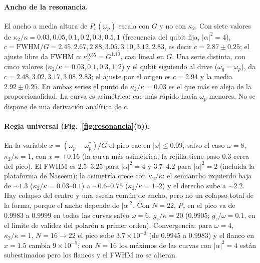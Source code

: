 \documentclass[11pt,a4paper]{article}
\newcommand{\wps}{\omega_p^{*}}
\theoremstyle{definition}
\begin{document}
\paragraph{Ancho de la resonancia.} El ancho a media altura de $P_c(\omega_p)$ escala con $G$ y no con $\kappa_2$. Con siete valores de $\kappa_2/\kappa=0.03,0.05,0.1,0.2,0.3,0.5,1$ (frecuencia del qubit fija, $|\alpha|^2=4$), $c=\mathrm{FWHM}/G=2.45,2.67,2.88,3.05,3.10,3.12,2.83$, es decir $c=2.87\pm0.25$; el ajuste libre da $\mathrm{FWHM}\propto\kappa_2^{0.55}=G^{1.10}$, casi lineal en $G$. Una serie distinta, con cinco valores ($\kappa_2/\kappa=0.03,0.1,0.3,1,2$) y el qubit siguiendo al drive ($\omega_q=\omega_p$), da $c=2.48,3.02,3.17,3.08,2.83$; el ajuste por el origen es $c=2.94$ y la media $2.92\pm0.25$. En ambas series el punto de $\kappa_2/\kappa=0.03$ es el que más se aleja de la proporcionalidad. La curva es asimétrica: cae más rápido hacia $\omega_p$ menores. No se dispone de una derivación analítica de $c$.

\paragraph{Regla universal (Fig.~\ref{fig:resonancia}(b)).} En la variable $x=(\omega_p-\wps)/G$ el pico cae en $|x|\leq0.09$, salvo el caso $\omega=8$, $\kappa_2/\kappa=1$, con $x=+0.16$ (la curva más asimétrica; la rejilla tiene paso $0.3$ cerca del pico). El FWHM es $2.5$--$3.25$ para $|\alpha|^2=4$ y $3.7$--$4.2$ para $|\alpha|^2=2$ (incluida la plataforma de Naseem); la asimetría crece con $\kappa_2/\kappa$: el semiancho izquierdo baja de $\sim1.3$ ($\kappa_2/\kappa=0.03$--$0.1$) a $\sim0.6$--$0.75$ ($\kappa_2/\kappa=1$--$2$) y el derecho sube a $\sim2.2$. Hay colapso del centro y una escala común de ancho, pero no un colapso total de la forma, porque el ancho depende de $|\alpha|^2$. Con $N=22$, $P_c$ en el pico va de $0.9983$ a $0.9999$ en todas las curvas salvo $\omega=6$, $g_z/\kappa=20$ ($0.9905$; $g_z/\omega=0.1$, en el límite de validez del polarón a primer orden). Convergencia: para $\omega=4$, $\kappa_2/\kappa=1$, $N=16\to22$ el pico sube $3.7\times10^{-3}$ (de $0.9945$ a $0.9983$) y el flanco en $x=1.5$ cambia $9\times10^{-5}$; con $N=16$ los máximos de las curvas con $|\alpha|^2=4$ están subestimados pero los flancos y el FWHM no se alteran.
\end{document}
